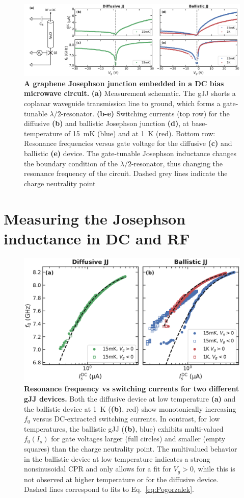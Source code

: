 \begin{figure}
	\centering
	\includegraphics[width=\linewidth]{chapter-gJJ-CPR/figs/Figure1}
	\caption{
		\textbf{A graphene Josephson junction embedded in a DC bias microwave circuit.}
		\textbf{(a)} Measurement schematic.
		The gJJ shorts a coplanar waveguide transmission line to ground, which forms a gate-tunable $\lambda/2$-resonator.
		\textbf{(b-e)} Switching currents (top row) for the diffusive \textbf{(b)} and ballistic Josephson junction \textbf{(d)}, at base-temperature of \SI{15}{\milli\kelvin} (blue) and at \SI{1}{\kelvin} (red).
		Bottom row: Resonance frequencies versus gate voltage for the diffusive \textbf{(c)} and ballistic \textbf{(e)} device.
		The gate-tunable Josephson inductance changes the boundary condition of the $\lambda/2$-resonator, thus changing the resonance frequency of the circuit.
		Dashed grey lines indicate the charge neutrality point
	}
	\label{fig:figure1}
\end{figure}


\section{Measuring the Josephson inductance in DC and RF}

\begin{figure}
	\centering
	\includegraphics[width=0.583\linewidth]{chapter-gJJ-CPR/figs/Figure2}
	\caption{
		\textbf{Resonance frequency vs switching currents for two different gJJ devices.}
		Both the diffusive device at low temperature \textbf{(a)} and the ballistic device at \SI{1}{\kelvin} (\textbf{(b)}, red) show monotonically increasing $f_0$ versus DC-extracted switching currents.
		In contrast, for low temperatures, the ballistic gJJ (\textbf{(b)}, blue) exhibits multi-valued $f_0\left(I_s\right)$ for gate voltages larger (full circles) and smaller (empty squares) than the charge neutrality point.
		The	multivalued behavior in the ballistic device at low temperature indicates a strong nonsinusoidal CPR and only allows for a fit for $V_g>0$, while this is not observed at higher temperature or for the diffusive device.
		Dashed lines correspond to fits to Eq.~\ref{eq:Pogorzalek}.
	}
	\label{fig:figure2}
\end{figure}

